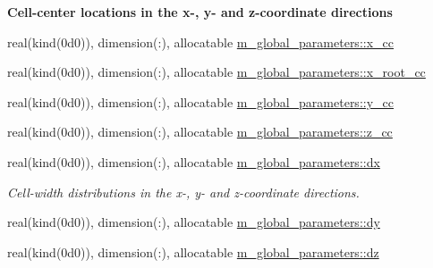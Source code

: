 \begin{Indent}\textbf{ Cell-\/center locations in the x-\/, y-\/ and z-\/coordinate directions}\par
\begin{DoxyCompactItemize}
\item 
real(kind(0d0)), dimension(\+:), allocatable \hyperlink{namespacem__global__parameters_aaf315f1df492ccc9daaeee046f185bb5}{m\+\_\+global\+\_\+parameters\+::x\+\_\+cc}
\item 
real(kind(0d0)), dimension(\+:), allocatable \hyperlink{namespacem__global__parameters_a94882b68d8ecf627c44e55c567659807}{m\+\_\+global\+\_\+parameters\+::x\+\_\+root\+\_\+cc}
\item 
real(kind(0d0)), dimension(\+:), allocatable \hyperlink{namespacem__global__parameters_ad7e05d3d526e5dfa14a74ffda890e63d}{m\+\_\+global\+\_\+parameters\+::y\+\_\+cc}
\item 
real(kind(0d0)), dimension(\+:), allocatable \hyperlink{namespacem__global__parameters_a2c4b9e99b981dc55cccf0b153159404e}{m\+\_\+global\+\_\+parameters\+::z\+\_\+cc}
\end{DoxyCompactItemize}
\end{Indent}
\textbf{ }\par
\begin{DoxyCompactItemize}
\item 
real(kind(0d0)), dimension(\+:), allocatable \hyperlink{namespacem__global__parameters_ac96de935d1ac1a172537dfcba610b976}{m\+\_\+global\+\_\+parameters\+::dx}
\begin{DoxyCompactList}\small\item\em Cell-\/width distributions in the x-\/, y-\/ and z-\/coordinate directions. \end{DoxyCompactList}\item 
real(kind(0d0)), dimension(\+:), allocatable \hyperlink{namespacem__global__parameters_abeca739b09557ccbf37b2ec35b0e73cc}{m\+\_\+global\+\_\+parameters\+::dy}
\item 
real(kind(0d0)), dimension(\+:), allocatable \hyperlink{namespacem__global__parameters_a30d96803eb46c67ff4f0f1d7c7b92a37}{m\+\_\+global\+\_\+parameters\+::dz}
\end{DoxyCompactItemize}

